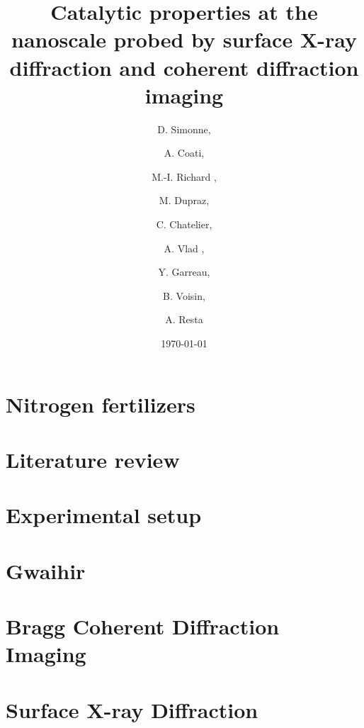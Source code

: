 \documentclass[xcolor=table, t, 9pt, head=0cm]{beamer}
\title[Main Title]
{   
    Catalytic properties at the nanoscale probed by surface X-ray diffraction and coherent diffraction imaging
}
\author
{D. Simonne\inst{1, 2},\and A. Coati\inst{1},\and M.-I. Richard \inst{2, 3},\and M. Dupraz\inst{2, 3},\and C. Chatelier\inst{2, 3},\and A. Vlad \inst{1},\and Y. Garreau\inst{1},\and B. Voisin\inst{1},\and A. Resta\inst{1}}
\institute
{
    \inst{1}
    Synchrotron SOLEIL
    \and
    \inst{2}
    Commissariat à l’énergie atomique et aux énergies alternatives – CEA Grenoble
    \and
    \inst{3}
    ESRF -- The European Synchrotron
}
\date{\footnotesize{\today}}
\begin{document}
	\begin{frame}[plain]
		\titlepage
	\end{frame}

    \section{Nitrogen fertilizers}
        
        
        
        
        

    \section{Literature review}
        
        
    
	\section{Experimental setup}
        
        
        
        
        

    \section{Gwaihir}
        
        
        
        

    \section{Bragg Coherent Diffraction Imaging}
        
        
        
        

    \section{Surface X-ray Diffraction}
        
        
        
        
        
        
        
        
        
        
        
        
        
\end{document}
